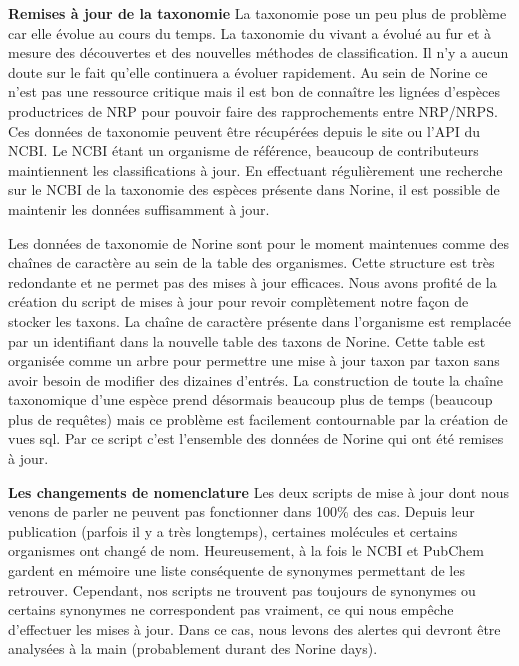 \textbf{Remises à jour de la taxonomie} 
La taxonomie pose un peu plus de problème car elle évolue au cours du temps.
La taxonomie du vivant a évolué au fur et à mesure des découvertes et des nouvelles méthodes de classification.
Il n'y a aucun doute sur le fait qu'elle continuera a évoluer rapidement.
Au sein de Norine ce n'est pas une ressource critique mais il est bon de connaître les lignées d'espèces productrices de NRP pour pouvoir faire des rapprochements entre NRP/NRPS.
Ces données de taxonomie peuvent être récupérées depuis le site ou l'API du NCBI.
Le NCBI étant un organisme de référence, beaucoup de contributeurs maintiennent les classifications à jour.
En effectuant régulièrement une recherche sur le NCBI de la taxonomie des espèces présente dans Norine, il est possible de maintenir les données suffisamment à jour.

Les données de taxonomie de Norine sont pour le moment maintenues comme des chaînes de caractère au sein de la table des organismes.
Cette structure est très redondante et ne permet pas des mises à jour efficaces.
Nous avons profité de la création du script de mises à jour pour revoir complètement notre façon de stocker les taxons.
La chaîne de caractère présente dans l'organisme est remplacée par un identifiant dans la nouvelle table des taxons de Norine.
Cette table est organisée comme un arbre pour permettre une mise à jour taxon par taxon sans avoir besoin de modifier des dizaines d'entrés.
La construction de toute la chaîne taxonomique d'une espèce prend désormais beaucoup plus de temps (beaucoup plus de requêtes) mais ce problème est facilement contournable par la création de vues sql.
Par ce script c'est l'ensemble des données de Norine qui ont été remises à jour.


\textbf{Les changements de nomenclature} 
Les deux scripts de mise à jour dont nous venons de parler ne peuvent pas fonctionner dans 100\% des cas.
Depuis leur publication (parfois il y a très longtemps), certaines molécules et certains organismes ont changé de nom.
Heureusement, à la fois le NCBI et PubChem gardent en mémoire une liste conséquente de synonymes permettant de les retrouver.
Cependant, nos scripts ne trouvent pas toujours de synonymes ou certains synonymes ne correspondent pas vraiment, ce qui nous empêche d'effectuer les mises à jour.
Dans ce cas, nous levons des alertes qui devront être analysées à la main (probablement durant des Norine days).


